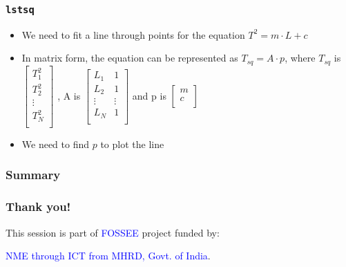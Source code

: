 \documentclass[14pt,compress]{beamer}
\newcommand{\typ}[1]{\lstinline{#1}}
\begin{document}
\begin{frame}[fragile]
  \frametitle{\typ{lstsq}}
  \begin{itemize}
  \item We need to fit a line through points for the equation $T^2 = m \cdot L+c$
  \item In matrix form, the equation can be represented as $T_{sq} = A \cdot p$, where $T_{sq}$ is
  $\begin{bmatrix}
  T^2_1 \\
  T^2_2 \\
  \vdots\\
  T^2_N \\
  \end{bmatrix}$
, A is   
  $\begin{bmatrix}
  L_1 & 1 \\
  L_2 & 1 \\
  \vdots & \vdots\\
  L_N & 1 \\
  \end{bmatrix}$
  and p is 
  $\begin{bmatrix}
  m\\
  c\\
  \end{bmatrix}$
  \item We need to find $p$ to plot the line
  \end{itemize}
\end{frame}

\begin{frame}[fragile]
  \frametitle{Summary}
  \begin{block}{}
        
  \end{block}
\end{frame}

\begin{frame}
  \frametitle{Thank you!}  
  \begin{block}{}
  This session is part of \textcolor{blue}{FOSSEE} project funded by:
  \begin{center}
    \textcolor{blue}{NME through ICT from MHRD, Govt. of India}.
  \end{center}  
  \end{block}
\end{frame}
\end{document}
